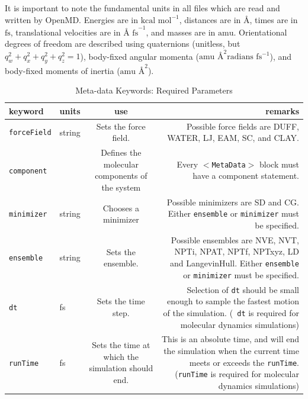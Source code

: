 \documentclass[]{book}
\begin{document}
It is important to note the fundamental units in all files which are
read and written by {\sc OpenMD}.  Energies are in $\mbox{kcal
mol}^{-1}$, distances are in $\mbox{\AA}$, times are in $\mbox{fs}$,
translational velocities are in $\mbox{\AA~fs}^{-1}$, and masses are
in $\mbox{amu}$.  Orientational degrees of freedom are described using
quaternions (unitless, but $q_w^2 + q_x^2 + q_y^2 + q_z^2 = 1$),
body-fixed angular momenta ($\mbox{amu \AA}^{2} \mbox{radians
fs}^{-1}$), and body-fixed moments of inertia ($\mbox{amu \AA}^{2}$). 

\begin{longtable}[c]{ABCD}
\caption{Meta-data Keywords: Required Parameters}
\\
{\bf keyword} & {\bf units} & {\bf use} & {\bf remarks}  \\ \hline
\endhead
\hline
\endfoot
{\tt forceField} & string & Sets the force field. & Possible force
fields are DUFF, WATER, LJ, EAM, SC, and CLAY. \\
{\tt component} & & Defines the molecular components of the system &
Every {\tt $<$MetaData$>$} block must have a component statement. \\
{\tt minimizer} & string & Chooses a minimizer & Possible minimizers
are SD and CG. Either {\tt ensemble} or {\tt minimizer} must be specified. \\
{\tt ensemble} & string & Sets the ensemble. & Possible ensembles are
NVE, NVT, NPTi, NPAT, NPTf, NPTxyz, LD and LangevinHull.  Either {\tt ensemble}
or {\tt minimizer} must be specified. \\
{\tt dt} & fs & Sets the time step. & Selection of {\tt dt} should be
small enough to sample the fastest motion of the simulation. ({\tt
dt} is required for molecular dynamics simulations)\\
{\tt runTime} & fs & Sets the time at which the simulation should
end. & This is an absolute time, and will end the simulation when the
current time meets or exceeds the {\tt runTime}. ({\tt runTime} is
required for molecular dynamics simulations)
\label{table:reqParams}
\end{longtable}
\end{document}
